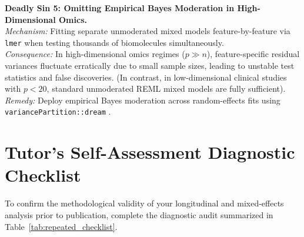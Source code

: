 \documentclass[11pt,twoside,openright]{book}
\begin{document}
\begin{pitfallbox}
\textbf{Deadly Sin 5: Omitting Empirical Bayes Moderation in High-Dimensional Omics.}\\
\textit{Mechanism:} Fitting separate unmoderated mixed models feature-by-feature via \texttt{lmer} when testing thousands of biomolecules simultaneously.\\
\textit{Consequence:} In high-dimensional omics regimes ($p \gg n$), feature-specific residual variances fluctuate erratically due to small sample sizes, leading to unstable test statistics and false discoveries. (In contrast, in low-dimensional clinical studies with $p < 20$, standard unmoderated REML mixed models are fully sufficient).\\
\textit{Remedy:} Deploy empirical Bayes moderation across random-effects fits using \texttt{variancePartition::dream} \cite{hoffman2021dream, ritchie2015limma}.
\end{pitfallbox}

\section{Tutor's Self-Assessment Diagnostic Checklist}

To confirm the methodological validity of your longitudinal and mixed-effects analysis prior to publication, complete the diagnostic audit summarized in Table~\ref{tab:repeated_checklist}.
\end{document}

